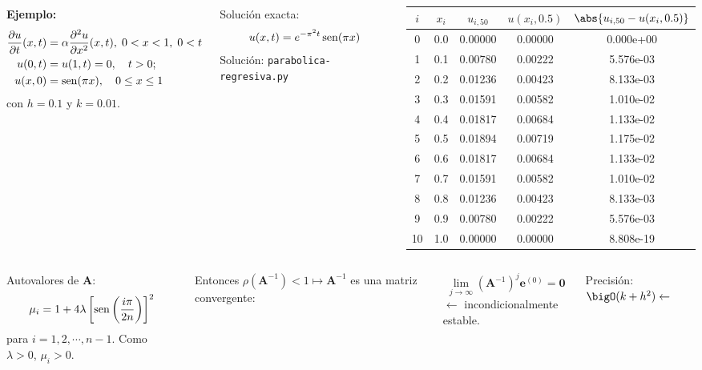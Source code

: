 \documentclass[9pt, aspectratio=169]{beamer}
\begin{document}
\begin{frame}
\begin{columns}
\textbf{Ejemplo:} 
\begin{align*}
\frac{\partial u}{\partial t} (x, t) &= \alpha \frac{\partial^2 u}{\partial x^2}(x, t), \; 0 < x < 1, \; 0 < t \\
u(0, t) &= u(1, t) = 0, \quad t > 0; \\
u(x, 0) &= \operatorname{sen}(\pi x), \quad 0 \leq x \leq 1
\end{align*}
con $h = 0.1$ y \alert{$k = 0.01$}.

Solución exacta:
\[u(x, t) = e^{-\pi^2 t} \operatorname{sen} (\pi x) \]
\centering Solución: \texttt{parabolica-regresiva.py}

\begin{center}
\begin{tabular}{ccccc}
\toprule
$i$ & $x_i$ & $u_{i,50}$ & $u(x_i, 0.5)$ & $\abs{u_{i, 50} - u(x_i, 0.5)}$ \\
\midrule
0 & 0.0 & 0.00000 & 0.00000 & 0.000e+00 \\
1 & 0.1 & 0.00780 & 0.00222 & 5.576e-03 \\
2 & 0.2 & 0.01236 & 0.00423 & 8.133e-03 \\
3 & 0.3 & 0.01591 & 0.00582 & 1.010e-02 \\
4 & 0.4 & 0.01817 & 0.00684 & 1.133e-02 \\
5 & 0.5 & 0.01894 & 0.00719 & 1.175e-02 \\
6 & 0.6 & 0.01817 & 0.00684 & 1.133e-02 \\
7 & 0.7 & 0.01591 & 0.00582 & 1.010e-02 \\
8 & 0.8 & 0.01236 & 0.00423 & 8.133e-03 \\
9 & 0.9 & 0.00780 & 0.00222 & 5.576e-03 \\
10 & 1.0 & 0.00000 & 0.00000 & 8.808e-19 \\
\bottomrule
\end{tabular} 
\end{center}
\end{columns} \pause
\vspace{1em}
\begin{columns}
\cx
Autovalores de $\bm{A}$:
\[ \mu_i = 1 + 4 \lambda \left[ \operatorname{sen} \left(\frac{i \pi}{2 n}\right) \right]^2 \]
para $i = 1, 2, \cdots, n-1$. Como $\lambda > 0$, $\mu_i > 0$.

\cx
Entonces $\rho(\bm{A}^{-1}) < 1 \mapsto \bm{A}^{-1}$ es una matriz convergente:
\begin{columns}
\[ \lim_{j \to \infty} (\bm{A}^{-1})^j \bm{e}^{(0)} = \bm{0} \]
$\leftarrow$ \alert{incondicionalmente estable}.
\end{columns} \pause
\centering Precisión: $\bigO(k + h^2) \leftarrow$ \faThumbsODown
\end{columns}
\end{frame}
\end{document}
